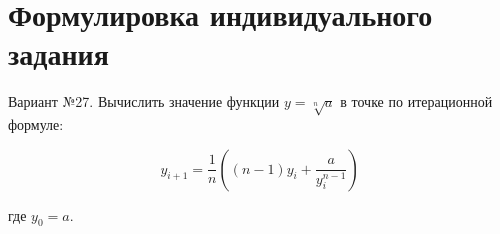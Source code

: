 \section{Формулировка индивидуального задания}

Вариант №27. Вычислить значение функции $ y = \sqrt[n]{a} $
в точке по итерационной формуле:

$$ y_{i+1} = \frac{1}{n} ((n - 1)y_i + \frac{a}{y_i^{n-1}}) $$

где $ y_0 = a $.
